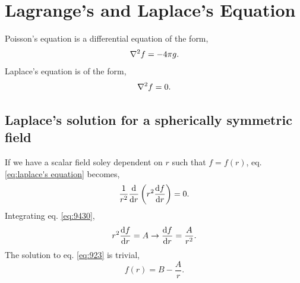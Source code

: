 \documentclass{book}
\begin{document}
\section{Lagrange's and Laplace's Equation}
Poisson's equation is a differential equation of the form,
\begin{equation}
	\laplacian{f} = -4\pi g. \label{eq:poisson's equation}
\end{equation}
Laplace's equation is of the form,
\begin{equation}
	\laplacian{f} = 0. \label{eq:laplace's equation}
\end{equation}
\subsection{Laplace's solution for a spherically symmetric field}
If we have a scalar field soley dependent on $r$ such that $f = f(r)$, eq. \eqref{eq:laplace's equation} becomes,
\begin{equation}
	\frac{1}{r^2}\dv{r}\left(r^2\dv{f}{r}\right) = 0. \label{eq:9430}
\end{equation}
Integrating eq. \eqref{eq:9430},
\begin{equation}
	r^2 \dv{f}{r} = A \to \dv{f}{r} = \frac{A}{r^2}. \label{eq:923}
\end{equation}
The solution to eq. \eqref{eq:923} is trivial,
\begin{equation}
	f(r) = B - \frac{A}{r}.
\end{equation}
\end{document}

